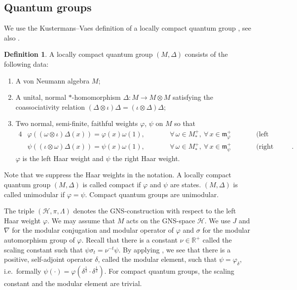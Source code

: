 \documentclass[pdftex]{sigma}
\numberwithin{equation}{section}
\theoremstyle{definition}
\newtheorem{dfn}[thm]{Definition}
\newcommand{\cHil}{\mathcal{H}}
\begin{document}
\subsection*{Quantum groups}

 We use the Kustermans--Vaes def\/inition of a locally compact quantum group \cite{KusVae,KusVaeII}, see also \cite{KusLec,Tim,DaeleLcqg}.
\begin{dfn}
A locally compact quantum group $(M, \Delta)$ consists of the
following data:
\begin{enumerate}\itemsep=0pt
 \item A von Neumann algebra $M$;
\item A unital, normal $\ast$-homomorphism $\Delta: M \rightarrow M \otimes M$ satisfying the coassociativity relation $(\Delta \otimes \iota) \Delta = (\iota \otimes \Delta) \Delta$;
\item  Two  normal, semi-f\/inite, faithful weights
$\varphi$, $\psi$ on $M$ so that
\begin{alignat*}{4}
& \varphi \left( (\omega \otimes \iota )\Delta(x)\right)=
\varphi(x)\omega(1), \qquad && \forall \, \omega \in M^+_*,\  \forall\,
x\in \mathfrak{m}^+_\varphi
\qquad && \text{(left invariance);}& \\
& \psi\left( (\iota \otimes\omega)\Delta(x)\right)=
\psi(x)\omega(1), \qquad && \forall \, \omega \in M^+_*,\ \forall\,
x\in \mathfrak{m}^+_\psi \qquad && \text{(right invariance)}. &
\end{alignat*}
$\varphi$ is the left Haar weight and $\psi$ the right Haar
weight.
\end{enumerate}
\end{dfn}
\noindent Note that we suppress the Haar weights in the notation. A locally compact quantum group $(M, \Delta)$ is called compact if $\varphi$ and $\psi$ are states. $(M, \Delta)$ is called unimodular if $\varphi = \psi$. Compact quantum groups are unimodular.

 The triple $(\cHil, \pi,
\Lambda)$ denotes the GNS-construction with respect to the left
Haar weight $\varphi$. We may assume that $M$ acts on the
GNS-space $\cHil$. We use $J$ and $\nabla$ for the modular conjugation and modular operator of $\varphi$ and $\sigma$ for the modular automorphism group of $\varphi$. Recall that there is a constant $\nu \in \mathbb{R}^+$ called the scaling constant such that $\psi \sigma_t = \nu^{-t} \psi$. By applying \cite{VaeRad}, we see that there is a positive, self-adjoint operator $\delta$, called the modular element, such that $\psi = \varphi_\delta$, i.e.\ formally $\psi(\cdot) = \varphi(\delta^{\frac{1}{2}} \cdot \delta^{\frac{1}{2}} )$. For compact quantum groups, the scaling constant and the modular element are trivial.
\end{document}
